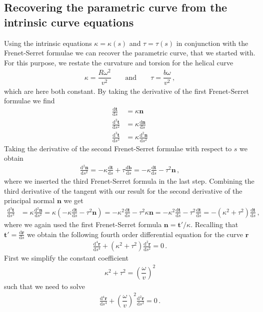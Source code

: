 \documentclass[11pt, DINA4, fleqn]{amsart}
\def\df{\mathrm{d}\xspace}
\newcommand{\dd}[2]{\frac{\df#1}{\df#2}}
\newcommand{\ddd}[2]{\frac{\df^2#1}{\df#2^2}}
\newcommand{\dddd}[2]{\frac{\df^3#1}{\df#2^3}}
\newcommand{\ddddd}[2]{\frac{\df^4#1}{\df#2^4}}
\def\vr{\boldsymbol{r}\xspace}
\def\vt{\boldsymbol{t}\xspace}
\def\vn{\boldsymbol{n}\xspace}
\def\vb{\boldsymbol{b}\xspace}
\begin{document}
\subsection{Recovering the parametric curve from the intrinsic curve equations}
Using the intrinsic equations $\kappa = \kappa(s)$ and $\tau = \tau(s)$ in conjunction with the Frenet-Serret formulae we can recover the parametric curve, that we started with. For this purpose, we restate the curvature and torsion for the helical curve
\begin{align}
\kappa = \dfrac{R\omega^2}{v^2} \qquad \text{and} \qquad \tau = \dfrac{b\omega}{v^2} \, ,
\end{align}
which are here both constant.
By taking the derivative of the first Frenet-Serret formulae we find
\begin{align}
\dd{\vt}{s} &= \kappa \vn \\
\ddd{\vt}{s} &= \kappa \dd{\vn}{s} \\
\dddd{\vt}{s} &= \kappa \ddd{\vn}{s}
\end{align}
Taking the derivative of the second Frenet-Serret formulae with respect to $s$ we obtain
\begin{align}
\ddd{\vn}{s} = -\kappa \dd{\vt}{s} + \tau\dd{\vb}{s} = -\kappa \dd{\vt}{s} - \tau^2 \vn \, ,
\end{align}
where we inserted the third Frenet-Serret formula in the last step.
Combining the third derivative of the tangent with our result for the second derivative of the principal normal $\vn$ we get
\begin{align}
\dddd{\vt}{s} &= \kappa \ddd{\vn}{s} = \kappa \left(
-\kappa \dd{\vt}{s} - \tau^2 \vn
\right) = -\kappa^2 \dd{\vt}{s} - \tau^2 \kappa \vn
= -\kappa^2 \dd{\vt}{s} - \tau^2 \dd{\vt}{s} = -(\kappa^2 + \tau^2) \dd{\vt}{s} \, ,
\end{align}
where we again used the first Frenet-Serret formula $\vn = \vt'/\kappa$.
Recalling that $\vt' = \dd{\vr}{s}$ we obtain the following fourth order differential equation for the curve $\vr$
\begin{align}
\ddddd{\vr}{s} + \left(\kappa^2 + \tau^2\right) \ddd{\vr}{s} = 0 \, .
\end{align}
First we simplify the constant coefficient
\begin{align}
\kappa ^2 + \tau^2 = \left(\dfrac{\omega}{v}\right)^2
\end{align}
such that we need to solve
\begin{align}
\ddddd{\vr}{s} +  \left(\dfrac{\omega}{v}\right)^2\ddd{\vr}{s} = 0 \, .
\end{align}
\end{document}
